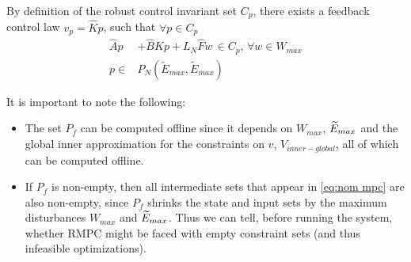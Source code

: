 By definition of the robust control invariant set $C_p$, there exists a feedback control law $v_p=\hat{K}p$, such that $\forall p\in C_p$
\begin{subequations}
\begin{align}
\label{eq:C_def}
\hat{A}p &+ \hat{B}Kp+L_N \hat{F}w \, \in C_p,\, \forall w \in W_{max} \\
p \in &P_N(\tilde{E}_{max}, \tilde{E}_{max})
\end{align}
\end{subequations}

It is important to note the following:
\begin{itemize}
	\item The set $P_f$ can be computed offline since it depends on $W_{max}$, $\widetilde{E}_{max}$ and the global inner approximation for the constraints on $v$, $V_{inner-global}$, all of which can be computed offline.
	\item If $P_f$ is non-empty, then all intermediate sets that appear in \eqref{eq:nom mpc} are also non-empty, since $P_f$ shrinks the state and input sets by the maximum disturbances $W_{max}$ and $\widetilde{E}_{max}$.	
	Thus we can tell, before running the system, whether RMPC might be faced with empty constraint sets (and thus infeasible optimizations).
\end{itemize}
%
%
